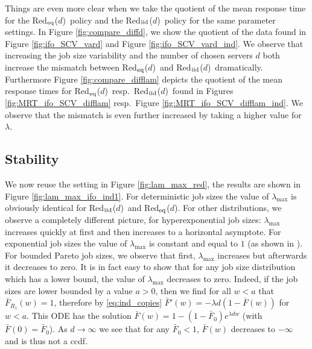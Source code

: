 \documentclass[12pt]{report}
\newcommand{\Redid}{Red$_{\textup{eq}}$($d$)}
\newcommand{\Redind}{Red$_{\textup{iid}}$($d$)}
\begin{document}
Things are even more clear when we take the quotient of the mean response time for the \Redid\ policy and the \Redind\ policy for the same parameter settings. In Figure \ref{fig:compare_diffd}, we show the quotient of the data found in Figure \ref{fig:ifo_SCV_vard} and Figure \ref{fig:ifo_SCV_vard_ind}. We observe that increasing the job size variability and the number of chosen servers $d$ both increase the mismatch between \Redid\ and \Redind\ dramatically. Furthermore Figure \ref{fig:compare_difflam} depicts the quotient of the mean response times for \Redid\ resp.~\Redind\ found in Figures \ref{fig:MRT_ifo_SCV_difflam}
 resp.~Figure \ref{fig:MRT_ifo_SCV_difflam_ind}. We observe that the mismatch is even further increased by taking a higher value for $\lambda$. 

\subsection{Stability}\label{sec:lambda_max_ind}
We now reuse the setting in Figure \ref{fig:lam_max_red}, the results are shown in Figure \ref{fig:lam_max_ifo_ind1}. For deterministic job sizes the value of $\lambda_{\max}$ is obviously identical for \Redind\ and \Redid . For other distributions, we observe a completely different picture, for hyperexponential job sizes: $\lambda_{\max}$ increases quickly at first and then increases to a horizontal asymptote. For exponential job sizes the value of $\lambda_{\max}$ is constant and equal to $1$ (as shown in \cite{gardnerOR}). For bounded Pareto job sizes, we observe that first, $\lambda_{\max}$ increases but afterwards it decreases to zero. It is in fact easy to show that for any job size distribution which has a lower bound, the value of $\lambda_{\max}$ decreases to zero. Indeed, if the job sizes are lower bounded by a value $a>0$, then  we find for all $w<a$ that $\bar F_{R_1}(w) = 1$, therefore by \eqref{eq:ind_copies} $\bar F'(w)=-\lambda d (1-\bar F(w))$ for $w < a$.
This ODE has the solution $\bar F(w)=1-(1-\bar F_0) e^{\lambda d w}$ (with $\bar F(0)=\bar F_0$). As $d\rightarrow \infty$ we see that for any $\bar F_0 < 1$, $\bar F(w)$ decreases to $-\infty$ and is thus
not a ccdf. 
\end{document}
